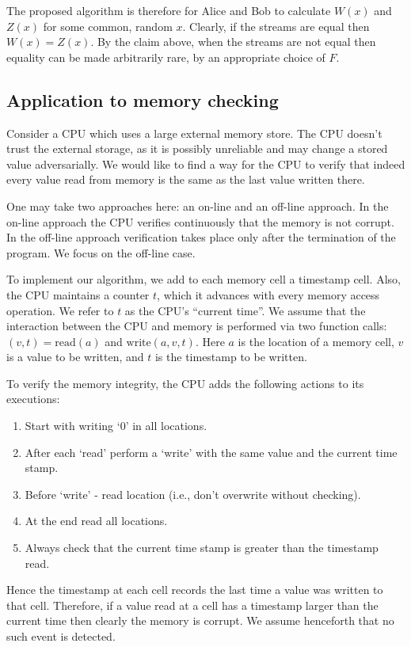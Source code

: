 \documentclass{article}
\begin{document}
The proposed algorithm is therefore for Alice and Bob to calculate
$W(x)$ and $Z(x)$ for some common, random $x$. Clearly, if the streams
are equal then $W(x) = Z(x)$. By the claim above, when the streams are
not equal then equality can be made arbitrarily rare, by an
appropriate choice of $F$.


\subsection{Application to memory checking}

Consider a CPU which uses a large external memory store. The CPU
doesn't trust the external storage, as it is possibly unreliable and
may change a stored value adversarially. We would like to find a way
for the CPU to verify that indeed every value read from memory is the
same as the last value written there.

One may take two approaches here: an on-line and an off-line
approach. In the on-line approach the CPU verifies continuously that
the memory is not corrupt. In the off-line approach verification takes
place only after the termination of the program. We focus on the
off-line case.

To implement our algorithm, we add to each memory cell a timestamp
cell. Also, the CPU maintains a counter $t$, which it advances with
every memory access operation. We refer to $t$ as the CPU's ``current
time''. We assume that the interaction between the CPU and memory is
performed via two function calls: $(v,t) = \mathrm{read}(a)$ and
$\mathrm{write}(a,v,t)$. Here $a$ is the location of a memory cell,
$v$ is a value to be written, and $t$ is the timestamp to be written.

To verify the memory integrity, the CPU adds the following actions to
its executions:
\begin{enumerate}
\item Start with writing `0' in all locations. 
\item After each `read' perform a `write' with the same value and the
  current time stamp.
\item Before `write' - read location (i.e., don't overwrite without
  checking).
\item At the end read all locations.
\item Always check that the current time stamp is greater than the
  timestamp read.
\end{enumerate}
Hence the timestamp at each cell records the last time a value was
written to that cell. Therefore, if a value read at a cell has a
timestamp larger than the current time then clearly the memory is
corrupt. We assume henceforth that no such event is detected.
\end{document}
